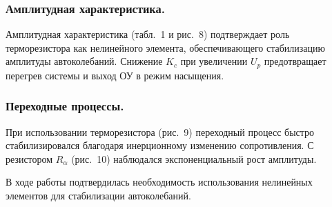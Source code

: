 \documentclass[a4paper, 12pt]{article}
\begin{document}
\subsubsection*{Амплитудная характеристика.} 
Амплитудная характеристика (табл.~1 и рис.~8) подтверждает роль терморезистора как нелинейного элемента, обеспечивающего стабилизацию амплитуды автоколебаний. Снижение \( K_c \) при увеличении \( U_p \) предотвращает перегрев системы и выход ОУ в режим насыщения.

\subsubsection*{Переходные процессы.} 
При использовании терморезистора (рис.~9) переходный процесс быстро стабилизировался благодаря инерционному изменению сопротивления. С резистором \( R_\alpha \) (рис.~10) наблюдался экспоненциальный рост амплитуды.

В ходе работы подтвердилась необходимость использования нелинейных элементов для стабилизации автоколебаний.
\end{document}
